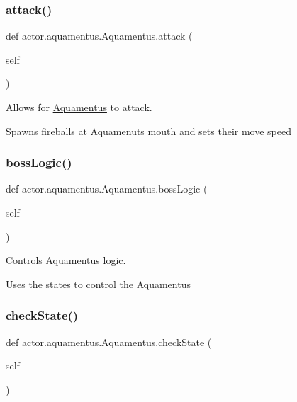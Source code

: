 \subsubsection{\texorpdfstring{attack()}{attack()}}
{\footnotesize\ttfamily def actor.\+aquamentus.\+Aquamentus.\+attack (\begin{DoxyParamCaption}\item[{}]{self }\end{DoxyParamCaption})}



Allows for \hyperlink{classactor_1_1aquamentus_1_1_aquamentus}{Aquamentus} to attack. 

Spawns fireballs at Aquamenuts\textquotesingle{} mouth and sets their move speed \mbox{\label{classactor_1_1aquamentus_1_1_aquamentus_a5569e3e099e8754db819fe31e893bb6f}} 
\subsubsection{\texorpdfstring{boss\+Logic()}{bossLogic()}}
{\footnotesize\ttfamily def actor.\+aquamentus.\+Aquamentus.\+boss\+Logic (\begin{DoxyParamCaption}\item[{}]{self }\end{DoxyParamCaption})}



Controls \hyperlink{classactor_1_1aquamentus_1_1_aquamentus}{Aquamentus} logic. 

Uses the states to control the \hyperlink{classactor_1_1aquamentus_1_1_aquamentus}{Aquamentus} \mbox{\label{classactor_1_1aquamentus_1_1_aquamentus_a9a995cf75da6e464cf0292c7514536e5}} 
\subsubsection{\texorpdfstring{check\+State()}{checkState()}}
{\footnotesize\ttfamily def actor.\+aquamentus.\+Aquamentus.\+check\+State (\begin{DoxyParamCaption}\item[{}]{self }\end{DoxyParamCaption})}




